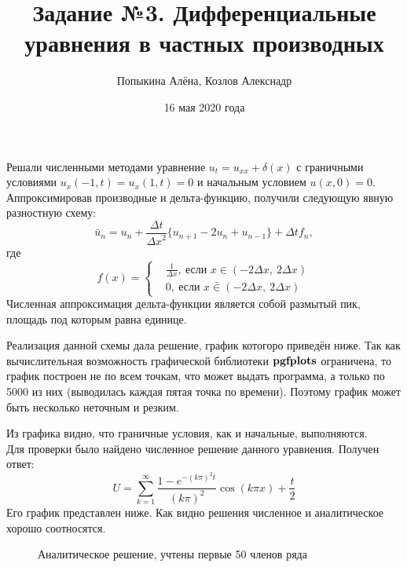 \documentclass[a4paper]{article}
\title{Задание №3. Дифференциальные уравнения в частных производных}
\author{Попыкина Алёна, Козлов Алекснадр}
\date{16 мая 2020 года}
\begin{document}
\maketitle
    Решали численными методами уравнение $u_t = u_{xx} + \delta(x)$ с граничными условиями $u_x(-1, t) = u_x(1, t) = 0$ и начальным условием $u(x, 0) = 0$. Аппроксимировав производные и дельта-функцию, получили следующую явную разностную схему:
    \begin{equation}\label{Numerical}
        \bar u_n= u_n+ \frac{\Delta t}{{\Delta x}^2}\{ u_{n+1}- 2u_n +u_{n-1}\} + \Delta t f_n,
    \end{equation}
    где
    \begin{equation}
        f(x) =
        \begin{cases}
         & \frac1{\Delta x},\ \text{если $x \in (-2\Delta x,\ 2\Delta x )$}\\
         & 0,\ \text{если $x \bar \in (-2\Delta x,\ 2\Delta x )$}
        \end{cases}
    \end{equation}
    Численная аппроксимация дельта-функции является собой размытый пик, площадь под которым равна единице.\par
    
    Реализация данной схемы дала решение, график котогоро приведён ниже. Так как вычислительная возможность графической библиотеки ${\tt {\bf pgfplots}}$ ограничена, то график построен не по всем точкам, что может выдать программа, а только по 5000 из них (выводилась каждая пятая точка по времени). Поэтому график может быть несколько неточным и резким.\par
    Из графика видно, что граничные условия, как и начальные, выполняются.\\
    Для проверки было найдено численное решение данного уравнения. Получен ответ:
\[
 U = \sum_{k=1}^{\infty} \frac{1-e^{-(k\pi)^2t}}{(k\pi)^2} \cos(k\pi x) + \frac{t}{2}
\]
Его график представлен ниже. Как видно решения численное и аналитическое хорошо соотносятся.
    \begin{figure}[h]
        \noindent{}
        \caption{Аналитическое решение, учтены первые 50 членов ряда}
        \label{graph1}
    \end{figure} 
\end{document}
